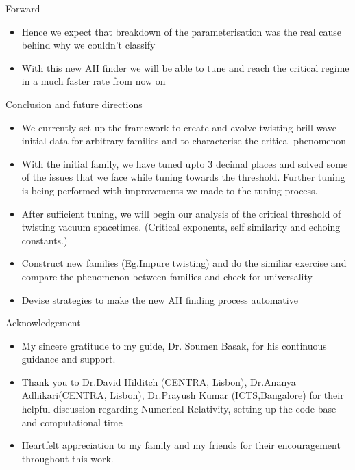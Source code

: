 \documentclass[9pt]{beamer}
\begin{document}
\begin{frame}
    \begin{alertblock}{Forward}

\begin{itemize}
    \item Hence we expect that breakdown of the parameterisation was the real cause behind why we couldn't classify 
    \item With this new AH finder we will be able to tune and reach the critical regime in a much faster rate from now on

\end{itemize}


\end{alertblock}  
\end{frame}
\begin{frame}{Conclusion and future directions}
    \begin{itemize}
    \item We currently set up the framework to create and evolve twisting brill wave initial data for arbitrary families and to characterise the critical phenomenon
        \item With the initial family, we have tuned upto 3 decimal places and solved some of the issues that we face while tuning towards the threshold. Further tuning is being performed with improvements we made to the tuning process.

        \item After sufficient tuning, we will begin our analysis of the critical threshold of twisting vacuum spacetimes. (Critical exponents,  self similarity and echoing constants.) 
        \item Construct new families (Eg.Impure twisting) and do the similiar exercise and compare the phenomenon between families and check for universality
        \item Devise strategies to make the new AH finding process automative 
    \end{itemize}
\end{frame}
\begin{frame}{Acknowledgement}
    \begin{itemize}
        \item My sincere gratitude to my guide, Dr. Soumen Basak, for his continuous guidance and support.
    \item Thank you to Dr.David Hilditch (CENTRA, Lisbon), Dr.Ananya Adhikari(CENTRA, Lisbon), Dr.Prayush Kumar (ICTS,Bangalore) for their helpful discussion regarding Numerical Relativity, setting up the code base and computational time 
    \item Heartfelt appreciation to my family and my friends for their encouragement throughout this work.
    \end{itemize}
\end{frame}
\appendix
\end{document}
